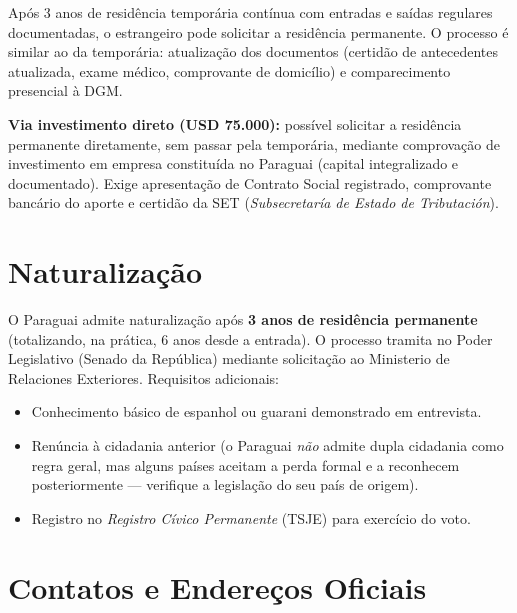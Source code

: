 Após 3 anos de residência temporária contínua com entradas e saídas regulares documentadas, o estrangeiro pode solicitar a residência permanente. O processo é similar ao da temporária: atualização dos documentos (certidão de antecedentes atualizada, exame médico, comprovante de domicílio) e comparecimento presencial à DGM.

\textbf{Via investimento direto (USD 75.000):} possível solicitar a residência permanente diretamente, sem passar pela temporária, mediante comprovação de investimento em empresa constituída no Paraguai (capital integralizado e documentado). Exige apresentação de Contrato Social registrado, comprovante bancário do aporte e certidão da SET (\textit{Subsecretaría de Estado de Tributación}).

\section*{Naturalização}

O Paraguai admite naturalização após \textbf{3 anos de residência permanente} (totalizando, na prática, 6 anos desde a entrada). O processo tramita no Poder Legislativo (Senado da República) mediante solicitação ao Ministerio de Relaciones Exteriores. Requisitos adicionais:

\begin{itemize}
\item Conhecimento básico de espanhol ou guarani demonstrado em entrevista.
\item Renúncia à cidadania anterior (o Paraguai \textit{não} admite dupla cidadania como regra geral, mas alguns países aceitam a perda formal e a reconhecem posteriormente --- verifique a legislação do seu país de origem).
\item Registro no \textit{Registro Cívico Permanente} (TSJE) para exercício do voto.
\end{itemize}

\section*{Contatos e Endereços Oficiais}

